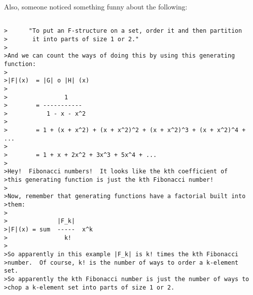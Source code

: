 Also, someone noticed something funny about the following: 

\begin{verbatim}

>      "To put an F-structure on a set, order it and then partition
>       it into parts of size 1 or 2."
>
>And we can count the ways of doing this by using this generating function:
>
>|F|(x)  = |G| o |H| (x)
>
>                1
>        = ----------- 
>           1 - x - x^2
>
>        = 1 + (x + x^2) + (x + x^2)^2 + (x + x^2)^3 + (x + x^2)^4 + ...
>
>        = 1 + x + 2x^2 + 3x^3 + 5x^4 + ...
>
>Hey!  Fibonacci numbers!  It looks like the kth coefficient of
>this generating function is just the kth Fibonacci number!
>
>Now, remember that generating functions have a factorial built into
>them:
>
>              |F_k|  
>|F|(x) = sum  -----  x^k
>                k!
>
>So apparently in this example |F_k| is k! times the kth Fibonacci
>number.  Of course, k! is the number of ways to order a k-element set.
>So apparently the kth Fibonacci number is just the number of ways to
>chop a k-element set into parts of size 1 or 2.  
\end{verbatim}
    

